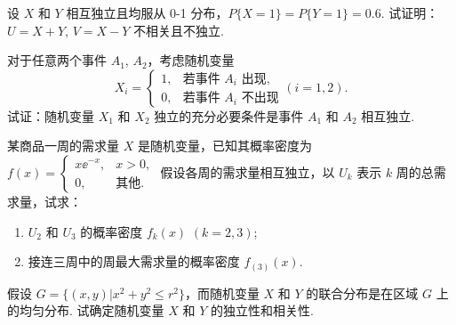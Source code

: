 	\begin{titwo}
		设 $X$ 和 $Y$ 相互独立且均服从 0-1 分布，$P\{X = 1\} = P\{Y = 1\} = 0.6$. 试证明：$U = X + Y$, $V = X - Y$ 不相关且不独立.
	\end{titwo}

	\begin{titwo}
		对于任意两个事件 $A_{1}$, $A_{2}$，考虑随机变量
		\[
			X_{i} = \begin{cases}
				1, & \text{若事件 $A_{i}$ 出现}, \\
				0, & \text{若事件 $A_{i}$ 不出现}
			\end{cases}(i = 1,2).
		\]
		试证：随机变量 $X_{1}$ 和 $X_{2}$ 独立的充分必要条件是事件 $A_{1}$ 和 $A_{2}$ 相互独立.
	\end{titwo}

	\begin{titwo}
		某商品一周的需求量 $X$ 是随机变量，已知其概率密度为 $f(x) = \begin{cases}
			x\ee^{-x}, & x > 0, \\
			0, & \text{其他}.
		\end{cases}$ 假设各周的需求量相互独立，以 $U_{k}$ 表示 $k$ 周的总需求量，试求：
		\begin{enumerate}
			\item $U_{2}$ 和 $U_{3}$ 的概率密度 $f_{k}(x)$ $(k = 2,3)$;
			\item 接连三周中的周最大需求量的概率密度 $f_{(3)}(x)$.
		\end{enumerate}
	\end{titwo}

	\begin{titwo}
		假设 $G = \bigl\{ (x,y) | x^{2} + y^{2} \leq r^{2} \bigr\}$，而随机变量 $X$ 和 $Y$ 的联合分布是在区域 $G$ 上的均匀分布. 试确定随机变量 $X$ 和 $Y$ 的独立性和相关性.
	\end{titwo}